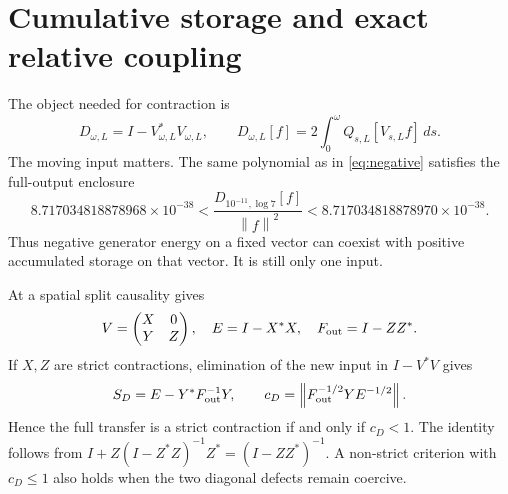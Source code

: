 \documentclass[11pt]{article}
\theoremstyle{remark}\newtheorem{remark}[theorem]{Remark}
\newcommand{\norm}[1]{\left\|#1\right\|}
\begin{document}
\section{Cumulative storage and exact relative coupling}\label{sec:cumulative}

The object needed for contraction is
\[
 D_{\omega,L}=I-V_{\omega,L}^*V_{\omega,L},\qquad
 D_{\omega,L}[f]=2\int_0^\omega Q_{s,L}[V_{s,L}f]\,ds.
\]
The moving input matters. The same polynomial as in \eqref{eq:negative} satisfies the full-output enclosure
\begin{equation}\label{eq:vectorstorage}
 8.717034818878968\times10^{-38}
 <\frac{D_{10^{-11},\log7}[f]}{\norm f^2}
 <8.717034818878970\times10^{-38}.
\end{equation}
Thus negative generator energy on a fixed vector can coexist with positive accumulated storage on that vector. It is still only one input.

At a spatial split causality gives
\[
 V=\begin{pmatrix}X&0\\Y&Z\end{pmatrix},\quad
 E=I-X^*X,\quad F_{\rm out}=I-ZZ^*.
\]
If $X,Z$ are strict contractions, elimination of the new input in $I-V^*V$ gives
\begin{equation}\label{eq:cD}
 S_D=E-Y^*F_{\rm out}^{-1}Y,\qquad
 c_D=\norm{F_{\rm out}^{-1/2}YE^{-1/2}}.
\end{equation}
Hence the full transfer is a strict contraction if and only if $c_D<1$. The identity follows from
$I+Z(I-Z^*Z)^{-1}Z^*=(I-ZZ^*)^{-1}$. A non-strict criterion with $c_D\le1$ also holds when the two diagonal defects remain coercive.
\end{document}
